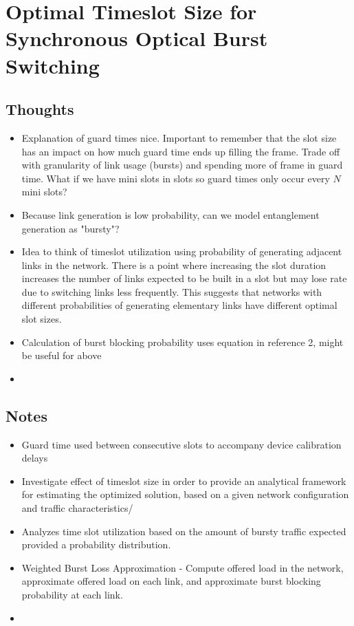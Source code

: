 \documentclass{article}
\begin{document}
\section{Optimal Timeslot Size for Synchronous Optical Burst Switching}

\subsection{Thoughts}
\begin{itemize}
    \item Explanation of guard times nice.  Important to remember that the slot size has an impact on how much guard time ends up filling the frame.  Trade off with granularity of link usage (bursts) and spending more of frame in guard time.  What if we have mini slots in slots so guard times only occur every $N$ mini slots?
    \item Because link generation is low probability, can we model entanglement generation as "bursty"?
    \item Idea to think of timeslot utilization using probability of generating adjacent links in the network.  There is a point where increasing the slot duration increases the number of links expected to be built in a slot but may lose rate due to switching links less frequently. This suggests that networks with different probabilities of generating elementary links have different optimal slot sizes.
    \item Calculation of burst blocking probability uses equation in reference 2, might be useful for above
    \item 
\end{itemize}

\subsection{Notes}
\begin{itemize}
    \item Guard time used between consecutive slots to accompany device calibration delays
    \item Investigate effect of timeslot size in order to provide an analytical framework for estimating the optimized solution, based on a given network configuration and traffic characteristics/
    \item  Analyzes time slot utilization based on the amount of bursty traffic expected provided a probability distribution.
    \item Weighted Burst Loss Approximation - Compute offered load in the network, approximate offered load on each link, and approximate burst blocking probability at each link.
    \item 
\end{itemize}
\end{document}
